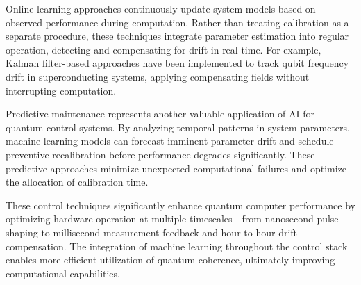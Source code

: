 Online learning approaches continuously update system models based on observed performance during computation. Rather than treating calibration as a separate procedure, these techniques integrate parameter estimation into regular operation, detecting and compensating for drift in real-time. For example, Kalman filter-based approaches have been implemented to track qubit frequency drift in superconducting systems, applying compensating fields without interrupting computation.

Predictive maintenance represents another valuable application of AI for quantum control systems. By analyzing temporal patterns in system parameters, machine learning models can forecast imminent parameter drift and schedule preventive recalibration before performance degrades significantly. These predictive approaches minimize unexpected computational failures and optimize the allocation of calibration time.

These control techniques significantly enhance quantum computer performance by optimizing hardware operation at multiple timescales - from nanosecond pulse shaping to millisecond measurement feedback and hour-to-hour drift compensation. The integration of machine learning throughout the control stack enables more efficient utilization of quantum coherence, ultimately improving computational capabilities. 
